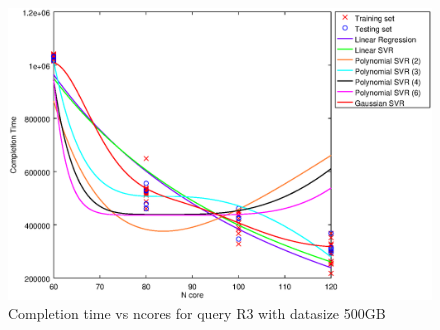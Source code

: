 
\begin {figure}[hbtp]
\centering
\includegraphics[width=\textwidth]{output/R3_500_ONLY_1_OVER_NCORES/plot_R3_500.eps}
\caption{Completion time vs ncores for query R3 with datasize 500GB}
\label{fig:all_nonlinear_R3_500}
\end {figure}
